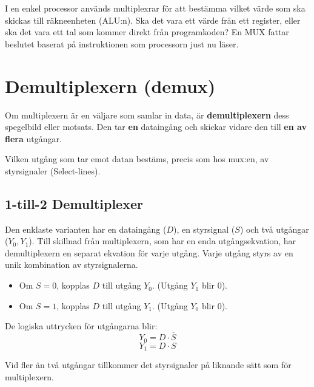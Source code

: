 \documentclass[
  swedish,
  letterpaper,
  oneside,
  openany]{book}
\providecommand{\tightlist}{%
  \setlength{\itemsep}{0pt}\setlength{\parskip}{0pt}}
\begin{document}
I en enkel processor används multiplexrar för att bestämma vilket värde
som ska skickas till räkneenheten (ALU:n). Ska det vara ett värde från
ett register, eller ska det vara ett tal som kommer direkt från
programkoden? En MUX fattar beslutet baserat på instruktionen som
processorn just nu läser.

\section{Demultiplexern (demux)}\label{demultiplexern-demux}

Om multiplexern är en väljare som samlar in data, är
\textbf{demultiplexern} dess spegelbild eller motsats. Den tar
\textbf{en} dataingång och skickar vidare den till \textbf{en av flera}
utgångar.

Vilken utgång som tar emot datan bestäms, precis som hos mux:en, av
styrsignaler (Select-lines).

\subsection{1-till-2 Demultiplexer}\label{till-2-demultiplexer}

Den enklaste varianten har en dataingång (\(D\)), en styrsignal (\(S\))
och två utgångar (\(Y_0, Y_1\)). Till skillnad från multiplexern, som
har en enda utgångsekvation, har demultiplexern en separat ekvation för
varje utgång. Varje utgång styrs av en unik kombination av
styrsignalerna.

\begin{itemize}
\tightlist
\item
  Om \(S = 0\), kopplas \(D\) till utgång \(Y_0\). (Utgång \(Y_1\) blir
  0).
\item
  Om \(S = 1\), kopplas \(D\) till utgång \(Y_1\). (Utgång \(Y_0\) blir
  0).
\end{itemize}

De logiska uttrycken för utgångarna blir: \[Y_0 = D \cdot \overline{S}\]
\[Y_1 = D \cdot S\]

Vid fler än två utgångar tillkommer det styrsignaler på liknande sätt
som för multiplexern.
\end{document}
